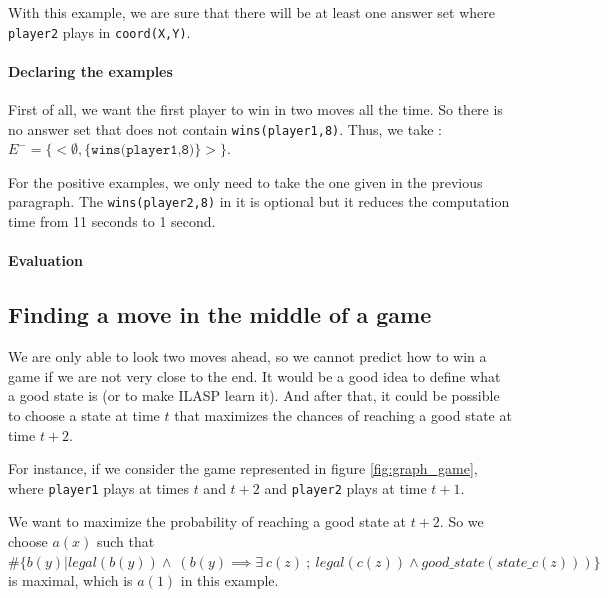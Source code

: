 \documentclass[12pt,twoside]{report}
\begin{document}
With this example, we are sure that there will be at least one answer set where \texttt{player2} plays in \texttt{coord(X,Y)}.


\paragraph{Declaring the examples}

First of all, we want the first player to win in two moves all the time. So there is no answer set that does not contain \texttt{wins(player1,8)}. Thus, we take : $E^-=\{<\emptyset,\{\texttt{wins(player1,8)}\}>\}$.

\bigskip

For the positive examples, we only need to take the one given in the previous paragraph. The \texttt{wins(player2,8)} in it is optional but it reduces the computation time from 11 seconds to 1 second.

\paragraph{Evaluation}


\subsection{Finding a move in the middle of a game}

We are only able to look two moves ahead, so we cannot predict how to win a game if we are not very close to the end. It would be a good idea to define what a good state is (or to make ILASP learn it). And after that, it could be possible to choose a state at time $t$ that maximizes the chances of reaching a good state at time $t+2$.

\bigskip

For instance, if we consider the game represented in figure \ref{fig:graph_game}, where \texttt{player1} plays at times $t$ and $t+2$ and \texttt{player2} plays at time $t+1$. 

\smallskip

We want to maximize the probability of reaching a good state at $t+2$. So we choose $a(x)$ such that $\#\{b(y)|legal(b(y))\wedge\:\left( b(y) \implies \exists \:c(z) \:;\: legal(c(z)) \wedge good\_state(state\_c(z)) \right)\}$ is maximal, which is $a(1)$ in this example.
\end{document}
